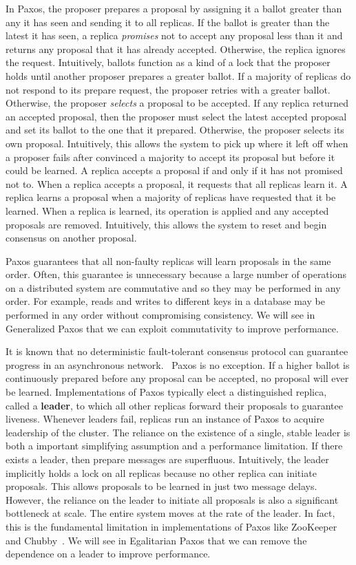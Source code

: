 \documentclass[../main.tex]{subfiles}
\begin{document}
  In Paxos, the proposer prepares a proposal by assigning it a ballot greater than any it has seen
  and sending it to all replicas. If the ballot is greater than the latest it has seen, a replica
  \emph{promises} not to accept any proposal less than it and returns any proposal that it has
  already accepted. Otherwise, the replica ignores the request. Intuitively, ballots function as a
  kind of a lock that the proposer holds until another proposer prepares a greater ballot. If a
  majority of replicas do not respond to its prepare request, the proposer retries with a greater
  ballot. Otherwise, the proposer \emph{selects} a proposal to be accepted. If any replica returned
  an accepted proposal, then the proposer must select the latest accepted proposal and set its
  ballot to the one that it prepared. Otherwise, the proposer selects its own proposal. Intuitively,
  this allows the system to pick up where it left off when a proposer fails after convinced a
  majority to accept its proposal but before it could be learned. A replica accepts a proposal if
  and only if it has not promised not to. When a replica accepts a proposal, it requests that all
  replicas learn it. A replica learns a proposal when a majority of replicas have requested that it
  be learned. When a replica is learned, its operation is applied and any accepted proposals are
  removed. Intuitively, this allows the system to reset and begin consensus on another proposal.

  Paxos guarantees that all non-faulty replicas will learn proposals in the same order. Often, this
  guarantee is unnecessary because a large number of operations on a distributed system are
  commutative and so they may be performed in any order. For example, reads and writes to different
  keys in a database may be performed in any order without compromising consistency. We will see in
  Generalized Paxos that we can exploit commutativity to improve performance.

  It is known that no deterministic fault-tolerant consensus protocol can guarantee progress in an
  asynchronous network.~\cite{consensus} Paxos is no exception. If a higher ballot is continuously
  prepared before any proposal can be accepted, no proposal will ever be learned. Implementations of
  Paxos typically elect a distinguished replica, called a \textbf{leader}, to which all other
  replicas forward their proposals to guarantee liveness. Whenever leaders fail, replicas run an
  instance of Paxos to acquire leadership of the cluster. The reliance on the existence of a single,
  stable leader is both a important simplifying assumption and a performance limitation. If there
  exists a leader, then prepare messages are superfluous. Intuitively, the leader implicitly holds
  a lock on all replicas because no other replica can initiate proposals. This allows proposals to
  be learned in just two message delays. However, the reliance on the leader to initiate all
  proposals is also a significant bottleneck at scale. The entire system moves at the rate of the
  leader. In fact, this is the fundamental limitation in implementations of Paxos like ZooKeeper
  ~\cite{zookeeper} and Chubby~\cite{chubby}. We will see in Egalitarian Paxos that we can remove
  the dependence on a leader to improve performance.
\end{document}
